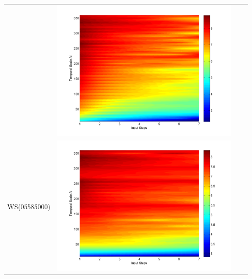 \documentclass[11pt]{article}
\begin{document}
\begin{table}[H]
{\begin{tabular}{cccc}
&\begin{minipage}{.3\textwidth}\includegraphics[width=\linewidth]{resultgraph/AU/02143000pepq_abs.png}\end{minipage}
\\
WS(05585000)
&\begin{minipage}{.3\textwidth}\includegraphics[width=\linewidth]{resultgraph/AU/05585000p_abs.png}\end{minipage}

\end{tabular}}
\end{table}
\end{document}
